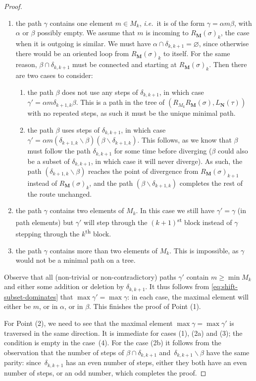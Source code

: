 \documentclass{amsart}
\theoremstyle{definition}
\newcommand{\ssm}{\smallsetminus} %
\newcommand{\ie}{\textit{i.e.}~} %
\newcommand{\ordinal}{\textsuperscript{th}} %
\newcommand{\ordinalst}{\textsuperscript{st}} %
\begin{document}
\begin{proof}
\begin{enumerate}
\item the path $\gamma$ contains one element $m\in M_k$, \ie it is of the form $\gamma = \alpha m \beta$, with $\alpha$ or $\beta$ possibly empty.
We assume that $m$ is incoming to $R_\mathbf{M}(\sigma)_{k}$, the case when it is outgoing is similar.
We must have $\alpha \cap \delta_{k,k+1}=\varnothing$, since otherwise there would be an oriented loop from $R_\mathbf{M}(\sigma)_{k}$ to itself.
For the same reason, $\beta \cap \delta_{k,k+1}$ must be connected and starting at $R_\mathbf{M}(\sigma)_{k}$.
Then there are two cases to consider:
	\begin{enumerate}
	\item the path $\beta$ does not use any steps of $\delta_{k,k+1}$, in which case $\gamma' = \alpha m \delta_{k+1,k} \beta$.
	This is a path in the tree of $(R_{M_k}R_{\mathbf{M}}(\sigma),L_{\mathbf{N}}(\tau))$ with no repeated steps, as such it must be the unique minimal path. 

	\item the path $\beta$ uses steps of $\delta_{k,k+1}$, in which case $\gamma' = \alpha m (\delta_{k+1,k}\ssm \beta)(\beta \ssm \delta_{k+1,k})$.
	This follows, as we know that $\beta$ must follow the path $\delta_{k,k+1}$ for some time before diverging ($\beta$ could also be a subset of $\delta_{k,k+1}$, in which case it will never diverge).
	As such, the path $(\delta_{k+1,k}\ssm \beta)$ reaches the point of divergence from $R_{\mathbf{M}}(\sigma)_{k+1}$ instead of $R_{\mathbf{M}}(\sigma)_{k}$, and the path $(\beta \ssm \delta_{k+1,k})$ completes the rest of the route unchanged.
	\end{enumerate}

\item the path $\gamma$ contains two elements of $M_k$. 
In this case we still have $\gamma'=\gamma$ (in path elements) but $\gamma'$ will step through the $(k+1)$\ordinalst{} block instead of $\gamma$ stepping through the $k$\ordinal{} block.

\item the path $\gamma$ contains more than two elements of $M_k$. 
This is impossible, as $\gamma$ would not be a minimal path on a tree.

\end{enumerate}
Observe that all (non-trivial or non-contradictory) paths $\gamma'$ contain $m \geq \min M_k$ and either some addition or deletion by $\delta_{k,k+1}$.
It thus follows from \cref{eq:shift-subset-dominates} that $\max \gamma' = \max \gamma$: in each case, the maximal element will either be $m$, or in $\alpha$, or in $\beta$.
This finishes the proof of Point (1).

For Point (2), we need to see that the maximal element $\max \gamma = \max \gamma'$ is traversed in the same direction.
It is immediate for cases (1), (2a) and (3); the condition is empty in the case~(4).
For the case (2b) it follows from the observation that the number of steps of $\beta \cap \delta_{k,k+1}$ and~$\delta_{k,k+1} \ssm \beta$ have the same parity: since~$\delta_{k,k+1}$ has an even number of steps, either they both have an even number of steps, or an odd number, which completes the proof.
\end{proof}
\end{document}

